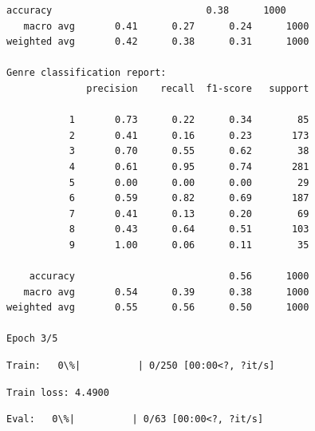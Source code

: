 \documentclass[11pt]{article}
\begin{document}
\begin{Verbatim}[commandchars=\\\{\}]
    accuracy                           0.38      1000
   macro avg       0.41      0.27      0.24      1000
weighted avg       0.42      0.38      0.31      1000

Genre classification report:
              precision    recall  f1-score   support

           1       0.73      0.22      0.34        85
           2       0.41      0.16      0.23       173
           3       0.70      0.55      0.62        38
           4       0.61      0.95      0.74       281
           5       0.00      0.00      0.00        29
           6       0.59      0.82      0.69       187
           7       0.41      0.13      0.20        69
           8       0.43      0.64      0.51       103
           9       1.00      0.06      0.11        35

    accuracy                           0.56      1000
   macro avg       0.54      0.39      0.38      1000
weighted avg       0.55      0.56      0.50      1000

Epoch 3/5
    \end{Verbatim}

    
    \begin{Verbatim}[commandchars=\\\{\}]
Train:   0\%|          | 0/250 [00:00<?, ?it/s]
    \end{Verbatim}

    
    \begin{Verbatim}[commandchars=\\\{\}]
Train loss: 4.4900
    \end{Verbatim}

    
    \begin{Verbatim}[commandchars=\\\{\}]
Eval:   0\%|          | 0/63 [00:00<?, ?it/s]
    \end{Verbatim}
\end{document}

